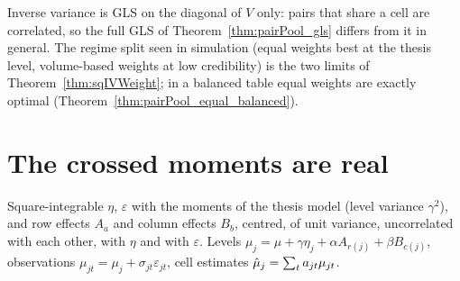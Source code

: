 \begin{remark}\label{rem:pool_gls_vs_iv}
  Inverse variance is GLS on the diagonal of $V$ only: pairs that share a cell are correlated, so
  the full GLS of Theorem~\ref{thm:pairPool_gls} differs from it in general. The regime split seen
  in simulation (equal weights best at the thesis level, volume-based weights at low credibility)
  is the two limits of Theorem~\ref{thm:sqIVWeight}; in a balanced table equal weights are exactly
  optimal (Theorem~\ref{thm:pairPool_equal_balanced}).
\end{remark}

\section{The crossed moments are real}\label{sec:crossed_moments}

\begin{definition}\label{def:noiseX}
  \leanok
  Square-integrable $\eta$, $\varepsilon$ with the moments of the thesis model (level variance
  $\gamma^2$), and row effects $A_a$ and column effects $B_b$, centred, of unit variance,
  uncorrelated with each other, with $\eta$ and with $\varepsilon$. Levels
  $\mu_j = \mu + \gamma\eta_j + \alpha A_{r(j)} + \beta B_{c(j)}$, observations
  $\mu_{jt} = \mu_j + \sigma_{jt}\varepsilon_{jt}$, cell estimates $\hat\mu_j = \sum_t a_{jt}\mu_{jt}$.
\end{definition}

